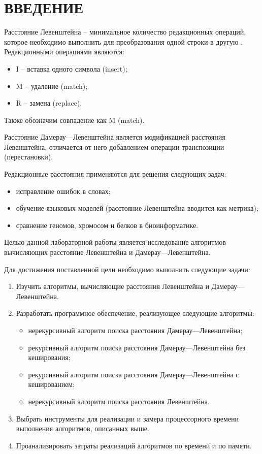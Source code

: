 \chapter*{ВВЕДЕНИЕ}

Расстояние Левенштейна -- минимальное количество редакционных операций, которое необходимо выполнить для преобразования одной строки в другую \cite{levenshtein}. Редакционными операциями являются: 
\begin{itemize}
	\item I -- вставка одного символа (insert);
	\item M -- удаление (match);
	\item R -- замена (replace).
\end{itemize}
Также обозначим совпадение как M (match).

Расстояние Дамерау---Левенштейна является модификацией расстояния Левенштейна, отличается от него добавлением операции транспозиции (перестановки).  

Редакционные расстояния применяются для решения следующих задач:
\begin{itemize}
	\item исправление ошибок в словах;
	\item обучение языковых моделей (расстояние Левенштейна вводится как метрика);
	\item сравнение геномов, хромосом и белков в биоинформатике.
\end{itemize}

Целью данной лабораторной работы является исследование алгоритмов вычисляющих расстояние Левенштейна и Дамерау---Левенштейна.

Для достижения поставленной цели необходимо выполнить следующие задачи:
\begin{enumerate}
	\item Изучить алгоритмы, вычисляющие расстояния Левенштейна и Дамерау---Левенштейна.
	\item Разработать программное обеспечение, реализующее следующие алгоритмы:
	\begin{itemize}
		\item нерекурсивный алгоритм поиска расстояния Дамерау---Левенштейна;
		\item рекурсивный алгоритм поиска расстояния Дамерау---Левенштейна без кеширования;
		\item рекурсивный алгоритм поиска расстояния Дамерау---Левенштейна с кешированием;
		\item нерекурсивный алгоритм поиска расстояния Левенштейна.
	\end{itemize}
	\item Выбрать инструменты для реализации и замера процессорного времени выполнения алгоритмов, описанных выше.
	\item Проанализировать затраты реализаций алгоритмов по времени и по памяти.
\end{enumerate}
